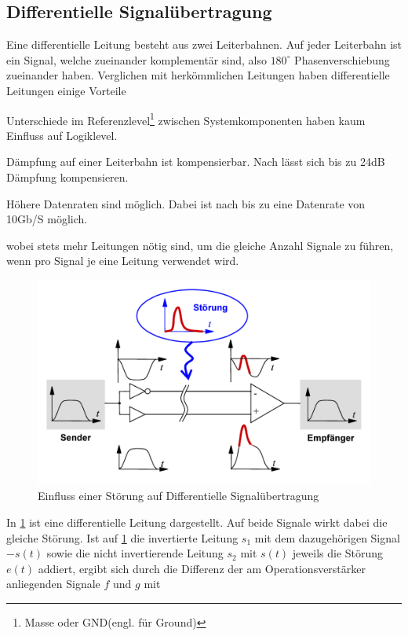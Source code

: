 \subsection{Differentielle Signalübertragung}
Eine differentielle Leitung besteht aus zwei Leiterbahnen. Auf jeder Leiterbahn ist ein Signal, welche zueinander komplementär sind, also $180^\circ $  Phasenverschiebung zueinander haben. Verglichen mit herkömmlichen Leitungen haben differentielle Leitungen einige Vorteile 
\begin{description}
\item Unterschiede im Referenzlevel\footnote{Masse oder GND(engl. für Ground)} zwischen Systemkomponenten haben kaum Einfluss auf Logiklevel.
\item Dämpfung auf einer Leiterbahn ist kompensierbar. Nach \cite{DifferentialSignalLine} lässt sich bis zu 24dB Dämpfung kompensieren.
\item Höhere Datenraten sind möglich. Dabei ist nach \cite{DifferentialSignalLine} bis zu  eine Datenrate von 10Gb/S möglich.
\end{description}
wobei stets mehr Leitungen nötig sind, um die gleiche Anzahl Signale zu führen, wenn pro Signal je eine Leitung verwendet wird. 
\begin{figure}[tbp]
  \centering
  \includegraphics[scale=1.5]{gfx/DiffSignalUebertragung.png}
  \caption{Einfluss einer Störung auf Differentielle Signalübertragung\cite{DiffSig}}
  \label{fig:DiffSig}
\end{figure}
In \ref{fig:DiffSig} ist eine differentielle Leitung dargestellt. Auf beide Signale wirkt dabei die gleiche Störung. Ist auf \ref{fig:DiffSig} die invertierte Leitung $s_{1}$ mit dem dazugehörigen Signal $-s(t)$ sowie die nicht invertierende Leitung $s_{2}$ mit $s(t)$ jeweils die Störung $e(t)$ addiert, ergibt sich durch die Differenz der am Operationsverstärker anliegenden Signale $f$ und $g$ mit 
